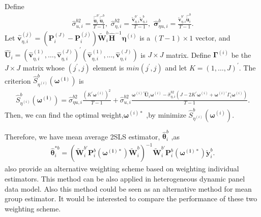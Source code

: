 \documentclass[12pt,a4paper,hyperref]{article}
\begin{document}
 Define
 \begin{align}
 \hat{\sigma}^{b 2}_{u, i}=\frac{\hat{\tilde{\boldsymbol{u}}}^{b'}_{i} \hat{\tilde{\boldsymbol{u}}}^{b}_{i}}{T-1}, \,\, \hat{\sigma}^{b2}_{\eta, i}=\frac{\tilde{\boldsymbol{v}}^{b '}_{\eta, i} \tilde{\boldsymbol{v}}^{b}_{\eta, i}}{T-1}, \,\, \hat{\boldsymbol{\sigma}}^{b}_{\eta u, i}=\frac{\tilde{\boldsymbol{v}}^{b'}_{\eta, i} \hat{\tilde{\boldsymbol{u}}}^{b}_{i}}{T-1}.
 \end{align}
 Let $\hat{\boldsymbol{v}}^{(j)}_{\eta, i}=\left(\boldsymbol{P}_{i}^{(J)}- \boldsymbol{P}_{i}^{(j)}\right)\tilde{\boldsymbol{W}}^{b}_{i}  \hat{\boldsymbol{H}}^{-1}\boldsymbol{\eta}^{(i)}$ is a $(T-1) \times 1$ vector, and $\hat{\boldsymbol{U}}_{i}=\left(\hat{\boldsymbol{v}}^{(1)}_{\eta, i}, \ldots, \hat{\boldsymbol{v}}^{(J)}_{\eta, i} \right)^{'}\left(\hat{\boldsymbol{v}}^{(1)}_{\eta, i}, \ldots, \hat{\boldsymbol{v}}^{(J)}_{\eta, i} \right)$ is $J \times J$ matrix. Define $\boldsymbol{\Gamma}^{(i)}$ be the $J \times J$ matrix whose $(j^{'}, j)$ element is $min(j^{'}, j)$ and let $K=(1, \ldots, J)^{'}$. The criterion $\hat{S}^{b}_{\eta^{(i)}}\left(\boldsymbol{\omega^{(i)}} \right)$ is
 \begin{align}
 \hat{S}^{b}_{\eta^{(i)}}\left(\boldsymbol{\omega^{(i)}} \right)=\hat{\sigma}^{b 2}_{\eta u, i} \frac{(K^{'}\boldsymbol{\omega}^{(i)})^{2}}{T-1}+\hat{\sigma}^{b2}_{u,i}\frac{\boldsymbol{\omega}^{(i)'}\hat{\boldsymbol{U}}_{i}\boldsymbol{\omega}^{(i)}-\hat{\sigma}^{b 2}_{\eta, i}(J-2K^{'}\boldsymbol{\omega}^{(i)}+\boldsymbol{\omega}^{(i)'}\Gamma_{i} \boldsymbol{\omega}^{(i)})}{T-1}.
 \end{align}
 Then, we can find the optimal weight,$\boldsymbol{\omega}^{(i)\ast}$ ,by minimize $\hat{S}^{b}_{\eta^{(i)}}(\boldsymbol{\omega}^{(i)})$.

Therefore, we have mean average 2SLS estimator, $\hat{\boldsymbol{\theta}}^{b}_{i}$ ,as
\begin{align}
\hat{\boldsymbol{\theta}}^{\ast b}_{i}= \left( \tilde{\boldsymbol{W}}^{b'}_{i}\boldsymbol{P}^{b}_{i}\left(\boldsymbol{\omega^{(i)\ast}} \right)\tilde{\boldsymbol{W}}^{b}_{i} \right)^{-1} \tilde{\boldsymbol{W}}^{b'}_{i}\boldsymbol{P}^{b}_{i}\left(\boldsymbol{\omega^{(i)\ast}} \right) \tilde{\boldsymbol{y}}^{b}_{i}.
\end{align}
\citet{Xiaohong:2016} also provide an alternative weighting scheme based on weighting individual estimators. This method can be also applied in heterogeneous dynamic panel data model. Also this method could be seen as an alternative method for mean group estimator. It would be interested to compare the performance of these two weighting scheme.
\end{document}
